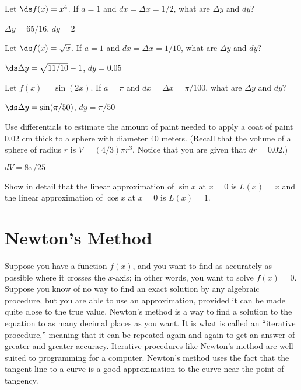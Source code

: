 \begin{exercises}

\begin{exercise} Let $\ds f(x) = x^4$. If $a=1$ and $dx= \Delta x =1/2$, 
what are $\Delta y$ and $dy$?
\begin{answer} $\Delta y=65/16$, $dy=2$
\end{answer}\end{exercise}

\begin{exercise} Let $\ds f(x) = \sqrt{x}$. If $a=1$ and $dx= \Delta x
=1/10$, what are $\Delta y$ and $dy$?
\begin{answer} $\ds \Delta y=\sqrt{11/10}-1$, $dy=0.05$
\end{answer}\end{exercise}


\begin{exercise} Let $f(x) = \sin (2x)$. If $a=\pi$ and $dx= \Delta x
=\pi/100$, what are $\Delta y$ and $dy$?
\begin{answer} $\ds \Delta y=\sin(\pi/50)$, $dy=\pi/50$
\end{answer}\end{exercise}

\begin{exercise} Use differentials to estimate the amount of paint needed to
 apply a coat of paint 0.02 cm thick to a sphere with diameter $40$
 meters. (Recall that the volume of a sphere of radius $r$ is $V
 =(4/3)\pi r^3$. Notice that you are given that $dr=0.02$.)
\begin{answer} $dV=8\pi/25$
\end{answer}\end{exercise}

\begin{exercise} Show in detail that the linear approximation of
 $\sin x$ at $x=0$ is $L(x)=x$ and the linear approximation of $\cos x$
 at $x=0$ is $L(x)=1$.
\end{exercise}
\end{exercises}










\section{Newton's Method}

Suppose you have a function $f(x)$, and you want to find as accurately as
possible where it crosses the $x$-axis; in other words, you want to solve
$f(x)=0$.  Suppose you know of no way to find an exact solution by any
algebraic procedure, but you are able to use an approximation,
provided it can be made quite close to the true value.
Newton's method is a way to find a solution to the
equation to as many decimal places as you want.  It is what is called an
``iterative procedure,'' meaning that it can be repeated again and again to
get an answer of greater and greater accuracy.  Iterative procedures like
Newton's method are well suited to programming for a
computer. Newton's method uses the fact that the tangent line to a
curve is a good approximation to the curve near the point of tangency.

